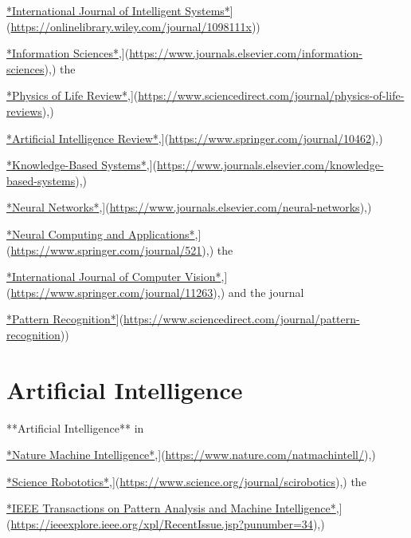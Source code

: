 \documentclass[
]{book}
\begin{document}
\href{\%5Bhttps://onlinelibrary.wiley.com/journal/1098111x}{*International Journal of Intelligent Systems*}{]}(\url{https://onlinelibrary.wiley.com/journal/1098111x}))

\href{\%5Bhttps://www.journals.elsevier.com/information-sciences}{*Information Sciences*},{]}(\url{https://www.journals.elsevier.com/information-sciences}),) the

\href{\%5Bhttps://www.sciencedirect.com/journal/physics-of-life-reviews}{*Physics of Life Review*},{]}(\url{https://www.sciencedirect.com/journal/physics-of-life-reviews}),)

\href{\%5Bhttps://www.springer.com/journal/10462}{*Artificial Intelligence Review*},{]}(\url{https://www.springer.com/journal/10462}),)

\href{\%5Bhttps://www.journals.elsevier.com/knowledge-based-systems}{*Knowledge-Based Systems*},{]}(\url{https://www.journals.elsevier.com/knowledge-based-systems}),)

\href{\%5Bhttps://www.journals.elsevier.com/neural-networks}{*Neural Networks*},{]}(\url{https://www.journals.elsevier.com/neural-networks}),)

\href{\%5Bhttps://www.springer.com/journal/521}{*Neural Computing and Applications*},{]}(\url{https://www.springer.com/journal/521}),) the

\href{\%5Bhttps://www.springer.com/journal/11263}{*International Journal of Computer Vision*},{]}(\url{https://www.springer.com/journal/11263}),) and the journal

\href{\%5Bhttps://www.sciencedirect.com/journal/pattern-recognition}{*Pattern Recognition*}{]}(\url{https://www.sciencedirect.com/journal/pattern-recognition}))

\chapter{Artificial Intelligence}\label{artificial-intelligence}

**Artificial Intelligence** in

\href{\%5Bhttps://www.nature.com/natmachintell/}{*Nature Machine Intelligence*},{]}(\url{https://www.nature.com/natmachintell/}),)

\href{\%5Bhttps://www.science.org/journal/scirobotics}{*Science Robototics*},{]}(\url{https://www.science.org/journal/scirobotics}),) the

\href{\%5Bhttps://ieeexplore.ieee.org/xpl/RecentIssue.jsp?punumber=34}{*IEEE Transactions on Pattern Analysis and Machine Intelligence*},{]}(\url{https://ieeexplore.ieee.org/xpl/RecentIssue.jsp?punumber=34}),)
\end{document}
